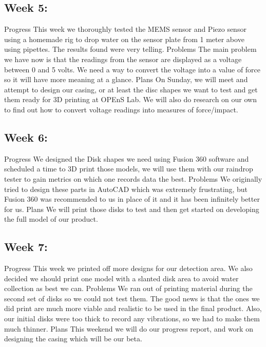 \documentclass[letterpaper,10pt,draftclsnofoot,onecolumn]{article}
\begin{document}
\subsection{Week 5:}
Progress
This week we thoroughly tested the MEMS sensor and Piezo sensor using a homemade rig to drop water on the sensor plate from 1 meter above using pipettes. The results found were very telling.
\newline
Problems
The main problem we have now is that the readings from the sensor are displayed as a voltage between 0 and 5 volts. We need a way to convert the voltage into a value of force so it will have more meaning at a glance.
\newline
Plans
On Sunday, we will meet and attempt to design our casing, or at least the disc shapes we want to test and get them ready for 3D printing at OPEnS Lab. We will also do research on our own to find out how to convert voltage readings into measures of force/impact.
 
\subsection{Week 6:}
Progress
We designed the Disk shapes we need using Fusion 360 software and scheduled a time to 3D print those models, we will use them with our raindrop tester to gain metrics on which one records data the best.
\newline
Problems
We originally tried to design these parts in AutoCAD which was extremely frustrating, but Fusion 360 was recommended to us in place of it and it has been infinitely better for us.
\newline
Plans
We will print those disks to test and then get started on developing the full model of our product.
 
\subsection{Week 7:}
Progress
This week we printed off more designs for our detection area. We also decided we should print one model with a slanted disk area to avoid water collection as best we can.
\newline
Problems
We ran out of printing material during the second set of disks so we could not test them. The good news is that the ones we did print are much more viable and realistic to be used in the final product. Also, our initial disks were too thick to record any vibrations, so we had to make them much thinner.
\newline
Plans
This weekend we will do our progress report, and work on designing the casing which will be our beta.
 
\end{document}
